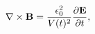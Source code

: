 \begin{equation}\label{ameq}
\nabla\times {\bf B}=\frac{\epsilon_{0}^{2}}{V(t)^{2}}
\frac{\partial {\bf E}}{\partial t},
\end{equation}

